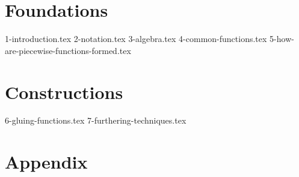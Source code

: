 \documentclass[10pt,a4paper]{article}
\begin{document}
\maketitle
\tableofcontents
\newpage

\part{Foundations}
{1-introduction.tex}
{2-notation.tex}
{3-algebra.tex}
{4-common-functions.tex}
{5-how-are-piecewise-functions-formed.tex}

\part{Constructions}
{6-gluing-functions.tex}
{7-furthering-techniques.tex}

\part{Appendix}
\printglossary[title=Glossary, toctitle=Glossary]
\glsaddallunused
\end{document}
